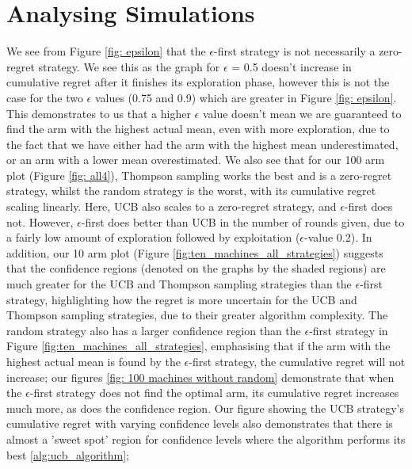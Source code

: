 \section{Analysing Simulations}\label{sec:analysing-simulations}
We see from Figure \ref{fig: epsilon} that the $\epsilon$-first strategy is not necessarily a zero-regret strategy.
We see this as the graph for $\epsilon$ = 0.5 doesn't increase in cumulative regret after it finishes its exploration phase, however this is not the case for the two $\epsilon$ values (0.75 and 0.9) which are greater in Figure \ref{fig: epsilon}.
This demonstrates to us that a higher $\epsilon$ value doesn't mean we are guaranteed to find the arm with the highest actual mean, even with more exploration, due to the fact that we have either had the arm with the highest mean underestimated, or an arm with a lower mean overestimated.
\newline
We also see that for our 100 arm plot (Figure \ref{fig: all4}), Thompson sampling works the best and is a zero-regret strategy, whilst the random strategy is the worst, with its cumulative regret scaling linearly.
Here, UCB also scales to a zero-regret strategy, and $\epsilon$-first does not.
However, $\epsilon$-first does better than UCB in the number of rounds given, due to a fairly low amount of exploration followed by exploitation ($\epsilon$-value 0.2).
\newline
In addition, our 10 arm plot (Figure \ref{fig:ten_machines_all_strategies}) suggests that the confidence regions (denoted on the graphs by the shaded regions) are much greater for the UCB and Thompson sampling strategies than the $\epsilon$-first strategy, highlighting how the regret is more uncertain for the UCB and Thompson sampling strategies, due to their greater algorithm complexity.
The random strategy also has a larger confidence region than the $\epsilon$-first strategy in Figure \ref{fig:ten_machines_all_strategies}, emphasising that if the arm with the highest actual mean is found by the $\epsilon$-first strategy, the cumulative regret will not increase;
our figures \ref{fig: 100 machines without random} demonstrate that when the $\epsilon$-first strategy does not find the optimal arm, its cumulative regret increases much more, as does the confidence region.
\newline
Our figure showing the UCB strategy's cumulative regret with varying confidence levels also demonstrates that there is almost a 'sweet spot' region for confidence levels where the algorithm performs its best \ref{alg:ucb_algorithm};
